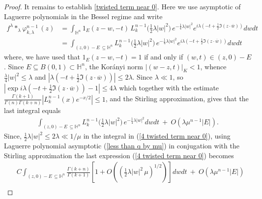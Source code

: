 \documentclass[11pt, reqno]{amsart}
\theoremstyle{plain}
\theoremstyle{remark}
\theoremstyle{example}
\theoremstyle{definition}
\numberwithin{equation}{section}
\def\Ha{\mathbb{H}^n}
\begin{document}
\begin{proof}
It remains to establish \eqref{twisted term near 0}. Here we use asymptotic of Laguerre polynomials in the Bessel regime and write  
    \begin{equation*}\label{3 twisted term near 0}
    \begin{split}
        f^{\lambda} \ast_{\lambda} \varphi_{k, \lambda}^{n-1} \, (z) &  = \int_{\mathbb H^n} 1_{E}(z-w,-t) \, L_k^{n-1}\big( {\textstyle \frac{1}{2}} \lambda|w|^2 \big) \, e^{- \frac{1}{4}\lambda |w|^2}   e^{i \lambda \left(-t+\frac12 \Im(z\cdot \overline{w}) \right)}dwdt \\
        & = \int_{(z,0) - E \,  \subseteq \mathbb H^n}  L_k^{n-1}\big( {\textstyle \frac{1}{2}} \lambda|w|^2 \big) \, e^{- \frac{1}{4}\lambda |w|^2}   e^{i \lambda \left(-t+\frac12 \Im(z\cdot \overline{w}) \right)}dwdt
    \end{split}
\end{equation*}
where,  we have used that  $1_{E}(z-w, -t)=1$ if and only if $(w,t) \in (z,0) - E$. Since $E \subseteq B(0,1) \subset \Ha$, the Kor\'anyi norm $|(w-z,t)|_{K} <1$, whence  $\frac{\lambda}{4} |w |^2 \leq \lambda$ and $| \lambda \left(-t+\frac12 \Im(z\cdot \overline{w}) \right) | \leq 2\lambda$. Since $\lambda \ll  1$, so $ \left| \exp{ i \lambda \left(-t+\frac12 \Im(z\cdot \overline{w}) \right) } - 1 \right| \leq 4 \lambda$ which together with the estimate $\frac{\Gamma(k+1)}{\Gamma(n)\Gamma(k+n)} |L_{k}^{n-1}(x) e^{-x/2}| \leq 1$,  and the Stirling approximation, gives that the last integral equals
\begin{equation}\label{4 twisted term near 0}
    \begin{split}
         \int_{(z,0) - E \,  \subseteq \mathbb H^n}  L_k^{n-1}\big( {\textstyle \frac{1}{2}} \lambda|w|^2 \big) \, e^{- \frac{1}{4}\lambda |w|^2}  dwdt \ + \ O \left( \lambda \mu^{n-1} |E| \right).
    \end{split}
\end{equation}
Since, ${\textstyle\frac{1}{2}} \lambda |w|^2 \leq 2 \lambda \ll 1/ \mu$  in the integral in (\ref{4 twisted term near 0}), using Laguerre polynomial asymptotic (\ref{less than q by mu}) in conjugation with the Stirling approximation the last expression (\ref{4 twisted term near 0})  becomes
\begin{equation*}\label{5 twisted term near 0}
    \begin{split}
        & C  \int_{(z,0) - E \,  \subseteq \mathbb H^n} \frac{\Gamma(k+n)}{\Gamma(k+1)} \left[ 1 + O  \left( \left( {\textstyle\frac{1}{2}} \lambda |w|^2 \, \mu \right)^{1/2} \right) \right]  dwdt \ + \ O \left( \lambda \mu^{n-1} |E| \right)\\

\end{split}
\end{equation*}
\end{proof}
\end{document}
